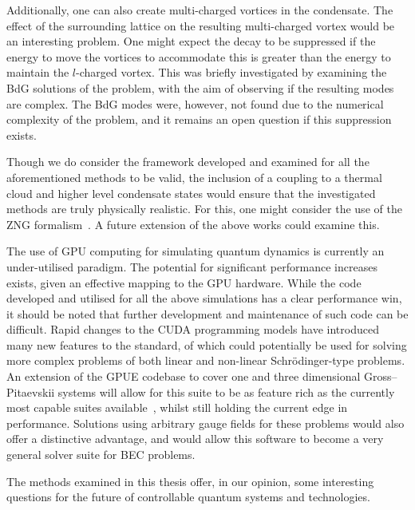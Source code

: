 Additionally, one can also create multi-charged vortices in the condensate. The effect of the surrounding lattice on the resulting multi-charged vortex would be an interesting problem. One might expect the decay to be suppressed if the energy to move the vortices to accommodate this is greater than the energy to maintain the $l$-charged vortex. This was briefly investigated by examining the BdG solutions of the problem, with the aim of observing if the resulting modes are complex. The BdG modes were, however, not found due to the numerical complexity of the problem, and it remains an open question if this suppression exists.

Though we do consider the framework developed and examined for all the aforementioned methods to be valid, the inclusion of a coupling to a thermal cloud and higher level condensate states would ensure that the investigated methods are truly physically realistic. For this, one might consider the use of the ZNG formalism~\cite{}. A future extension of the above works could examine this.

The use of GPU computing for simulating quantum dynamics is currently an under-utilised paradigm. The potential for significant performance increases exists, given an effective mapping to the GPU hardware. While the code developed and utilised for all the above simulations has a clear performance win, it should be noted that further development and maintenance of such code can be difficult. Rapid changes to the CUDA programming models have introduced many new features to the standard, of which could potentially be used for solving more complex problems of both linear and non-linear Schr\"odinger-type problems. An extension of the GPUE codebase to cover one and three dimensional Gross--Pitaevskii systems will allow for this suite to be as feature rich as the currently most capable suites available~\cite{NUM:Wittek_cpc_2013,NUM:GPElab_1}, whilst still holding the current edge in performance. Solutions using arbitrary gauge fields for these problems would also offer a distinctive advantage, and would allow this software to become a very general solver suite for BEC problems.

The methods examined in this thesis offer, in our opinion, some interesting questions for the future of controllable quantum systems and technologies.
